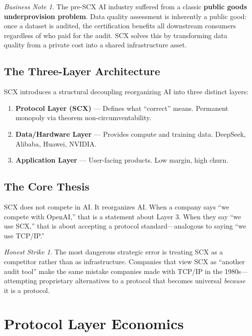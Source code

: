 \documentclass[12pt,a4paper]{article}
\theoremstyle{remark}
\newtheorem{businessnote}{Business Note}[section]
\newenvironment{businessbox}{%
  \begin{center}\color{blue}\begin{minipage}{0.92\textwidth}\begin{businessnote}}{%
  \end{businessnote}\end{minipage}\end{center}}
\newtheorem{honesthit}{Honest Strike}[section]
\newenvironment{hitbox}{%
  \begin{center}\color{red}\begin{minipage}{0.92\textwidth}\begin{honesthit}}{%
  \end{honesthit}\end{minipage}\end{center}}
\begin{document}
\begin{businessbox}
The pre-SCX AI industry suffered from a classic \textbf{public goods underprovision problem}. Data quality assessment is inherently a public good: once a dataset is audited, the certification benefits all downstream consumers regardless of who paid for the audit. SCX solves this by transforming data quality from a private cost into a shared infrastructure asset.
\end{businessbox}

\subsection{The Three-Layer Architecture}
SCX introduces a structural decoupling reorganizing AI into three distinct layers:
\begin{enumerate}[label=\textbf{\arabic*}, leftmargin=*]
    \item \textbf{Protocol Layer (SCX)} --- Defines what ``correct'' means. Permanent monopoly via theorem non-circumventability.
    \item \textbf{Data/Hardware Layer} --- Provides compute and training data. DeepSeek, Alibaba, Huawei, NVIDIA.
    \item \textbf{Application Layer} --- User-facing products. Low margin, high churn.
\end{enumerate}

\subsection{The Core Thesis}
SCX does not compete in AI. It reorganizes AI. When a company says ``we compete with OpenAI,'' that is a statement about Layer 3. When they say ``we use SCX,'' that is about accepting a protocol standard---analogous to saying ``we use TCP/IP.''

\begin{hitbox}
The most dangerous strategic error is treating SCX as a competitor rather than as infrastructure. Companies that view SCX as ``another audit tool'' make the same mistake companies made with TCP/IP in the 1980s---attempting proprietary alternatives to a protocol that becomes universal \textit{because} it is a protocol.
\end{hitbox}
\section{Protocol Layer Economics}
\end{document}
